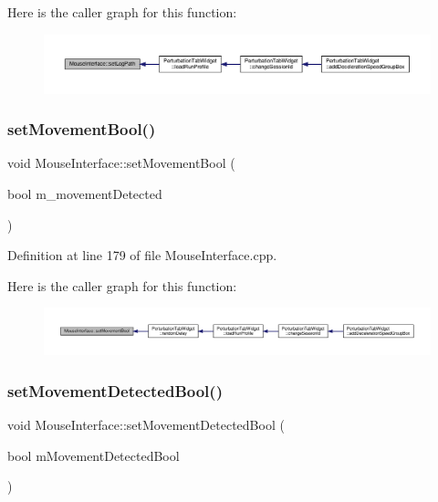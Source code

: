 Here is the caller graph for this function\+:
\nopagebreak
\begin{figure}[H]
\begin{center}
\leavevmode
\includegraphics[width=350pt]{class_mouse_interface_ae0058db1b8c881a51c446518cdf992d7_icgraph}
\end{center}
\end{figure}
\mbox{\label{class_mouse_interface_a8e6054b825c48d9bcdb539fc1625e5d5}} 
\subsubsection{\texorpdfstring{set\+Movement\+Bool()}{setMovementBool()}}
{\footnotesize\ttfamily void Mouse\+Interface\+::set\+Movement\+Bool (\begin{DoxyParamCaption}\item[{bool}]{m\+\_\+movement\+Detected }\end{DoxyParamCaption})}



Definition at line 179 of file Mouse\+Interface.\+cpp.

Here is the caller graph for this function\+:
\nopagebreak
\begin{figure}[H]
\begin{center}
\leavevmode
\includegraphics[width=350pt]{class_mouse_interface_a8e6054b825c48d9bcdb539fc1625e5d5_icgraph}
\end{center}
\end{figure}
\mbox{\label{class_mouse_interface_a51ed7e2eaaacd6f471c93c2537fa228c}} 
\subsubsection{\texorpdfstring{set\+Movement\+Detected\+Bool()}{setMovementDetectedBool()}}
{\footnotesize\ttfamily void Mouse\+Interface\+::set\+Movement\+Detected\+Bool (\begin{DoxyParamCaption}\item[{bool}]{m\+Movement\+Detected\+Bool }\end{DoxyParamCaption})}



